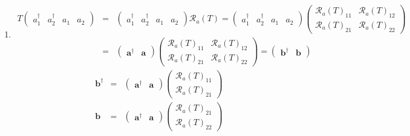 \documentclass[aps,preprint]{revtex4}
\begin{document}
\begin{enumerate}
\item 
\begin{eqnarray}
T\left( 
\begin{array}{cccc}
a_{1}^{\dagger } & a_{2}^{\dagger } & a_{1} & a_{2}%
\end{array}%
\right) &=&\left( 
\begin{array}{cccc}
a_{1}^{\dagger } & a_{2}^{\dagger } & a_{1} & a_{2}%
\end{array}%
\right) \mathcal{R}_{a}\left( T\right) =\left( 
\begin{array}{cccc}
a_{1}^{\dagger } & a_{2}^{\dagger } & a_{1} & a_{2}%
\end{array}%
\right) \left( 
\begin{array}{cc}
\mathcal{R}_{a}\left( T\right) _{11} & \mathcal{R}_{a}\left( T\right) _{12}
\\ 
\mathcal{R}_{a}\left( T\right) _{21} & \mathcal{R}_{a}\left( T\right) _{22}%
\end{array}%
\right) \\
&=&\left( 
\begin{array}{cc}
\boldsymbol{a}^{\dagger } & \boldsymbol{a}%
\end{array}%
\right) \left( 
\begin{array}{cc}
\mathcal{R}_{a}\left( T\right) _{11} & \mathcal{R}_{a}\left( T\right) _{12}
\\ 
\mathcal{R}_{a}\left( T\right) _{21} & \mathcal{R}_{a}\left( T\right) _{22}%
\end{array}%
\right) =\left( 
\begin{array}{cc}
\boldsymbol{b}^{\dagger } & \boldsymbol{b}%
\end{array}%
\right)
\end{eqnarray}%
\begin{eqnarray}
\boldsymbol{b}^{\dagger } &=&\left( 
\begin{array}{cc}
\boldsymbol{a}^{\dagger } & \boldsymbol{a}%
\end{array}%
\right) \left( 
\begin{array}{c}
\mathcal{R}_{a}\left( T\right) _{11} \\ 
\mathcal{R}_{a}\left( T\right) _{21}%
\end{array}%
\right) \\
\boldsymbol{b} &=&\left( 
\begin{array}{cc}
\boldsymbol{a}^{\dagger } & \boldsymbol{a}%
\end{array}%
\right) \left( 
\begin{array}{c}
\mathcal{R}_{a}\left( T\right) _{21} \\ 
\mathcal{R}_{a}\left( T\right) _{22}%
\end{array}%
\right)
\end{eqnarray}


\end{enumerate}
\end{document}
